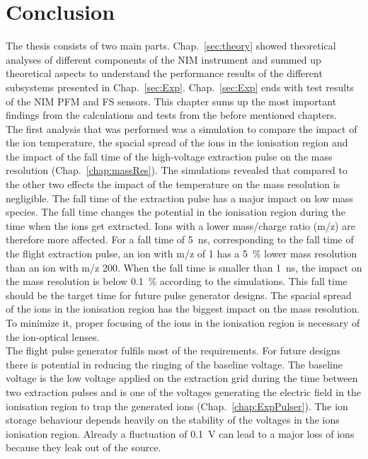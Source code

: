 \section{Conclusion}
	
	The thesis consists of two main parts. Chap.~\ref{sec:theory} showed theoretical analyses of different components of the NIM instrument and summed up theoretical aspects to understand the performance results of the different subsystems presented in Chap.~\ref{sec:Exp}. Chap.~\ref{sec:Exp} ends with test results of the NIM PFM and FS sensors. This chapter sums up the most important findings from the calculations and tests from the before mentioned chapters.\\

	The first analysis that was performed was a simulation to compare the impact of the ion temperature, the spacial spread of the ions in the ionisation region and the impact of the fall time of the high-voltage extraction pulse on the mass resolution (Chap.~\ref{chap:massRes}). The simulations revealed that compared to the other two effects the impact of the temperature on the mass resolution is negligible. The fall time of the extraction pulse has a major impact on low mass species. The fall time changes the potential in the ionisation region during the time when the ions get extracted. Ions with a lower mass/charge ratio (m/z) are therefore more affected. For a fall time of 5~ns, corresponding to the fall time of the flight extraction pulse, an ion with m/z of 1 has a 5~\% lower mass resolution than an ion with m/z 200. When the fall time is smaller than 1~ns, the impact on the mass resolution is below 0.1~\% according to the simulations. This fall time should be the target time for future pulse generator designs.
	The spacial spread of the ions in the ionisation region has the biggest impact on the mass resolution. To minimize it, proper focusing of the ions in the ionisation region is necessary of the ion-optical lenses.\\
	The flight pulse generator fulfils most of the requirements. For future designs there is potential in reducing the ringing of the baseline voltage. The baseline voltage is the low voltage applied on the extraction grid during the time between two extraction pulses and is one of the voltages generating the electric field in the ionisation region to trap the generated ions (Chap.~\ref{chap:ExpPulser}). The ion storage behaviour depends heavily on the stability of the voltages in the ions ionisation region. Already a fluctuation of 0.1~V can lead to a major loss of ions because they leak out of the source.\\ %
